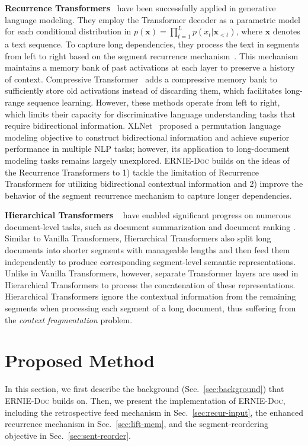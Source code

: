 \documentclass[11pt,a4paper]{article}
\newcommand{\mname}{\textsc{ERNIE-Doc}\xspace}
\begin{document}
\noindent\textbf{Recurrence Transformers}~\citep{transformer_xl, compressive_transformer} have been successfully applied in generative language modeling. They employ the Transformer decoder as a parametric model for each conditional distribution in $p(\bm{x})=\prod_{t=1}^Lp(x_t|\bm{x}_{<t})$, where $\bm{x}$ denotes a text sequence. To capture long dependencies, they process the text in segments from left to right based on the segment recurrence mechanism~\citep{transformer_xl}. This mechanism maintains a memory bank of past activations at each layer to preserve a history of context. Compressive Transformer~\citep{compressive_transformer} adds a compressive memory bank to sufficiently store old activations instead of discarding them, which facilitates long-range sequence learning. However, these methods operate from left to right, which limits their capacity for discriminative language understanding tasks that require bidirectional information. XLNet~\citep{yang2019xlnet} proposed a permutation language modeling objective to construct bidirectional information and achieve superior performance in multiple NLP tasks; however, its application to long-document modeling tasks remains largely unexplored. \mname builds on the ideas of the Recurrence Transformers to 1) tackle the limitation of Recurrence Transformers for utilizing bidirectional contextual information and 2) improve the behavior of the segment recurrence mechanism to capture longer dependencies.

\noindent\textbf{Hierarchical Transformers} ~\citep{zhang2019hibert, lin2020pretrained} have enabled significant progress on numerous document-level tasks, such as document summarization \citep{zhang2019hibert} and document ranking \citep{lin2020pretrained}. Similar to Vanilla Transformers, Hierarchical Transformers also split long documents into shorter segments with manageable lengths and then feed them independently to produce corresponding segment-level semantic representations. Unlike in Vanilla Transformers, however, separate Transformer layers are used in Hierarchical Transformers to process the concatenation of these representations. Hierarchical Transformers ignore the contextual information from the remaining segments when processing each segment of a long document, thus suffering from the \textit{context fragmentation} problem.
 
\section{Proposed Method}
In this section, we first describe the background (Sec.~\ref{sec:background}) that \mname builds on. Then, we present the implementation of \mname, including the retrospective feed mechanism in Sec.~\ref{sec:recur-input}, the enhanced recurrence mechanism in Sec.~\ref{sec:lift-mem}, and the segment-reordering objective in Sec.~\ref{sec:sent-reorder}.
\end{document}
